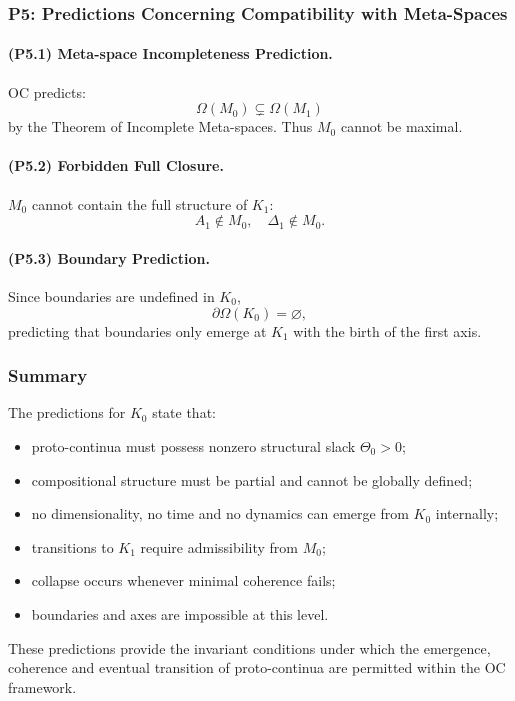 \subsubsection{P5: Predictions Concerning Compatibility with Meta-Spaces}

\paragraph{(P5.1) Meta-space Incompleteness Prediction.}
OC predicts:
\[
\Omega(M_0) \subsetneq \Omega(M_1)
\]
by the Theorem of Incomplete Meta-spaces.  
Thus $M_0$ cannot be maximal.

\paragraph{(P5.2) Forbidden Full Closure.}
$M_0$ cannot contain the full structure of $K_1$:
\[
A_1 \notin M_0,\quad \Delta_1 \notin M_0.
\]

\paragraph{(P5.3) Boundary Prediction.}
Since boundaries are undefined in $K_0$,
\[
\partial\Omega(K_0) = \varnothing,
\]
predicting that boundaries only emerge at $K_1$ with the birth of the first axis.

\subsubsection{Summary}

The predictions for $K_0$ state that:

\begin{itemize}
    \item proto-continua must possess nonzero structural slack $\Theta_0>0$;
    \item compositional structure must be partial and cannot be globally defined;
    \item no dimensionality, no time and no dynamics can emerge from $K_0$ internally;
    \item transitions to $K_1$ require admissibility from $M_0$;
    \item collapse occurs whenever minimal coherence fails;
    \item boundaries and axes are impossible at this level.
\end{itemize}

These predictions provide the invariant conditions under which  
the emergence, coherence and eventual transition of proto-continua  
are permitted within the OC framework.
